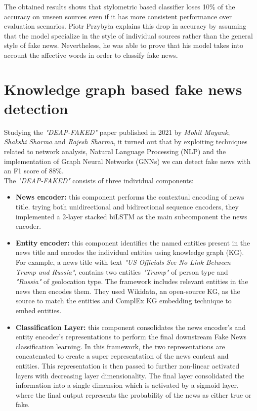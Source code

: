 \documentclass[10pt, english]{report}
\begin{document}
The obtained results shows that stylometric based classifier loses 10\% of the accuracy on unseen sources even if it has more consistent performance over evaluation scenarios. Piotr Przybyła explains this drop in accuracy by assuming that the model specialize in the style of individual sources rather than the general style of fake news. Nevertheless, he was able to prove that his model takes into account the affective words in order to classify fake news.
\section{Knowledge graph based fake news detection \cite{mayank2021deap} \cite{gad2019tracy}}
Studying the \textit{"DEAP-FAKED"} paper published in 2021 by \textit{Mohit Mayank}, \textit{Shakshi Sharma} and \textit{Rajesh Sharma}, it turned out that by exploiting techniques related to network analysis, Natural Language Processing (NLP) and the implementation of Graph Neural Networks (GNNs) we can detect fake news with an F1 score of 88\%.\\

The \textit{"DEAP-FAKED"} consists of three individual components:

\begin{itemize}
\item \textbf{News encoder:} this component performs the contextual encoding of news title. trying both unidirectional and bidirectional sequence encoders, they implemented a 2-layer stacked biLSTM as the main subcomponent the news encoder.
\item \textbf{Entity encoder:} this component identifies the named entities present in the news title and encodes the individual entities using knowledge graph (KG).
For example, a news title with text \textit{"US Officials See No Link Between Trump and Russia"}, contains two entities \textit{"Trump"} of person type and \textit{"Russia"} of geolocation type.
The framework includes relevant entities in the news then encodes them. They used Wikidata, an open-source KG, as the source to match the entities and ComplEx KG embedding technique to embed entities.
\item \textbf{Classification Layer:} this component consolidates the news encoder's and entity encoder's representations to perform the final downstream Fake News classification learning.
In this framework, the two representations are concatenated to create a super representation of the news content and entities. This representation is then passed to further non-linear activated layers with decreasing layer dimensionality. The final layer consolidated the information into a single dimension which is activated by a sigmoid layer, where the final output represents the probability of the news as either true or fake.
\end{itemize}
\end{document}
